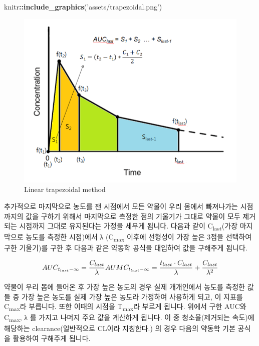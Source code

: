 \documentclass[12pt,]{krantz}
\newenvironment{Shaded}{\begin{snugshade}}{\end{snugshade}}
\newcommand{\KeywordTok}[1]{\textcolor[rgb]{0.13,0.29,0.53}{\textbf{#1}}}
\newcommand{\StringTok}[1]{\textcolor[rgb]{0.31,0.60,0.02}{#1}}
\newcommand{\OperatorTok}[1]{\textcolor[rgb]{0.81,0.36,0.00}{\textbf{#1}}}
\newcommand{\NormalTok}[1]{#1}
\theoremstyle{definition}
\theoremstyle{definition}
\theoremstyle{definition}
\theoremstyle{remark}
\begin{document}
\begin{Shaded}
\begin{Highlighting}[]
\NormalTok{knitr}\OperatorTok{::}\KeywordTok{include_graphics}\NormalTok{(}\StringTok{'assets/trapezoidal.png'}\NormalTok{)}
\end{Highlighting}
\end{Shaded}

\begin{figure}
\includegraphics[width=1\linewidth]{assets/trapezoidal} \caption{Linear trapezoidal method}\label{fig:trapezoid}
\end{figure}

추가적으로 마지막으로 농도를 잰 시점에서 모든 약물이 우리 몸에서
빠져나가는 시점까지의 값을 구하기 위해서 마지막으로 측정한 점의 기울기가
그대로 약물이 모두 제거되는 시점까지 그대로 유지된다는 가정을 세우게
됩니다. 다음과 같이 C\textsubscript{last}(가장 마지막으로 농도를 측정한
시점)에서 λ (C\textsubscript{max} 이후에 선형성이 가장 높은 3점을
선택하여 구한 기울기)를 구한 후 다음과 같은 약동학 공식을 대입하여 값을
구해주게 됩니다.

\[
AUC_{t_{last}-\infty} = 
  \frac{C_{last}}{\lambda} \\
AUMC_{t_{last}-\infty} = 
  \frac{t_{last} \cdot C_{last}}{\lambda} + 
  \frac{C_{last}}{\lambda^2}
\]

약물이 우리 몸에 들어온 후 가장 높은 농도의 경우 실제 개개인에서 농도를
측정한 값들 중 가장 높은 농도를 실제 가장 높은 농도라 가정하여 사용하게
되고, 이 지표를 C\textsubscript{max}라 부릅니다. 또한 이때의 시점을
T\textsubscript{max}라 부르게 됩니다. 위에서 구한 AUC와
C\textsubscript{max}, λ 를 가지고 나머지 주요 값을 계산하게 됩니다. 이
중 청소율(제거되는 속도)에 해당하는 clearance(일반적으로 CL이라
지칭한다.) 의 경우 다음의 약동학 기본 공식을 활용하여 구해주게 됩니다.
\end{document}

